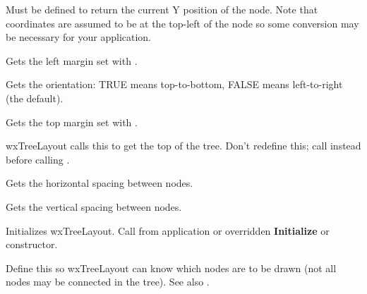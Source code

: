 
Must be defined to return the current Y position of the node. Note that
coordinates are assumed to be at the top-left of the node so some conversion
may be necessary for your application.



Gets the left margin set with .



Gets the orientation: TRUE means top-to-bottom, FALSE means left-to-right (the default).



Gets the top margin set with .



wxTreeLayout calls this to get the top of the tree. Don't redefine this; call
\rtfsp{} instead before calling .



Gets the horizontal spacing between nodes.



Gets the vertical spacing between nodes.



Initializes wxTreeLayout. Call from application or overridden {\bf Initialize}
or constructor.

\label{wxtreelayoutnodeactive}


Define this so wxTreeLayout can know which nodes are to be drawn (not all
nodes may be connected in the tree). See also .

